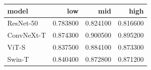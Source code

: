 \begin{tabular}{lrrr}
\toprule
model & low & mid & high \\
\midrule
ResNet-50 & 0.783800 & 0.824100 & 0.816600 \\
ConvNeXt-T & 0.874300 & 0.900500 & 0.895200 \\
ViT-S & 0.837500 & 0.884100 & 0.873300 \\
Swin-T & 0.840400 & 0.872800 & 0.871200 \\
\bottomrule
\end{tabular}
